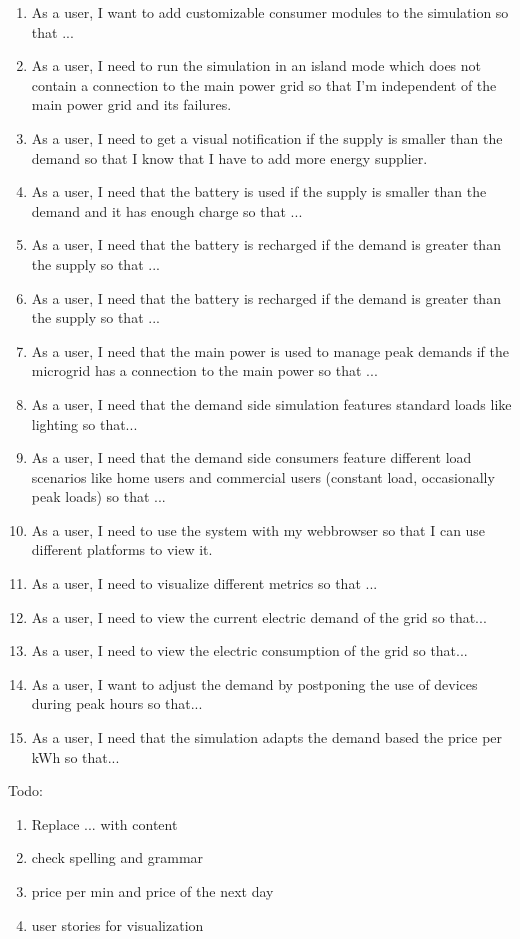 \begin{enumerate}
\item As a user, I want to add customizable consumer modules to the simulation so that ...

\item As a user, I need to run the simulation in an island mode which does not contain a connection to the main power grid so that I'm independent of the main power grid and its failures.

\item As a user, I need to get a visual notification if the supply is smaller than the demand so that I know that I have to add more energy supplier.

\item As a user, I need that the battery is used if the supply is smaller than the demand and it has enough charge so that ...

\item As a user, I need that the battery is recharged if the demand is greater than the supply so that ...

\item As a user, I need that the battery is recharged if the demand is greater than the supply so that ...

\item As a user, I need that the main power is used to manage peak demands if the microgrid has a connection to the main power so that ...

\item As a user, I need that the demand side simulation features standard loads like lighting so that...

\item As a user, I need that the demand side consumers feature different load scenarios like home users and commercial users (constant load, occasionally peak loads) so that ...

\item As a user, I need to use the system with my webbrowser so that I can use different platforms to view it.

\item As a user, I need to visualize different metrics so that ...

\item As a user, I need to view the current electric demand of the grid so that...

\item As a user, I need to view the electric consumption of the grid so that...

\item As a user, I want to adjust the demand by postponing the use of devices during peak hours so that...

\item As a user, I need that the simulation adapts the demand based the price per kWh so that...



\end{enumerate}
Todo:\\
\begin{enumerate}
	\item Replace ... with content
	\item check spelling and grammar
	\item price per min and price of the next day
	\item user stories for visualization
\end{enumerate}


